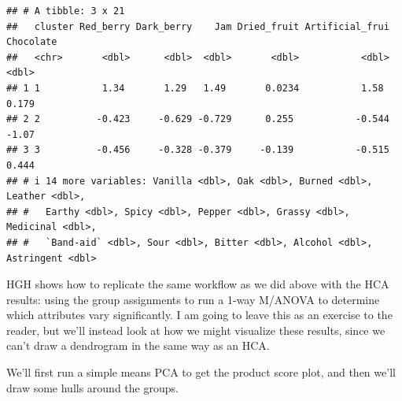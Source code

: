 \documentclass[
]{book}
\begin{document}
\begin{verbatim}
## # A tibble: 3 x 21
##   cluster Red_berry Dark_berry    Jam Dried_fruit Artificial_frui Chocolate
##   <chr>       <dbl>      <dbl>  <dbl>       <dbl>           <dbl>     <dbl>
## 1 1           1.34       1.29   1.49       0.0234           1.58      0.179
## 2 2          -0.423     -0.629 -0.729      0.255           -0.544    -1.07 
## 3 3          -0.456     -0.328 -0.379     -0.139           -0.515     0.444
## # i 14 more variables: Vanilla <dbl>, Oak <dbl>, Burned <dbl>, Leather <dbl>,
## #   Earthy <dbl>, Spicy <dbl>, Pepper <dbl>, Grassy <dbl>, Medicinal <dbl>,
## #   `Band-aid` <dbl>, Sour <dbl>, Bitter <dbl>, Alcohol <dbl>, Astringent <dbl>
\end{verbatim}

HGH shows how to replicate the same workflow as we did above with the HCA results: using the group assignments to run a 1-way M/ANOVA to determine which attributes vary significantly. I am going to leave this as an exercise to the reader, but we'll instead look at how we might visualize these results, since we can't draw a dendrogram in the same way as an HCA.

We'll first run a simple means PCA to get the product score plot, and then we'll draw some hulls around the groups.
\end{document}
